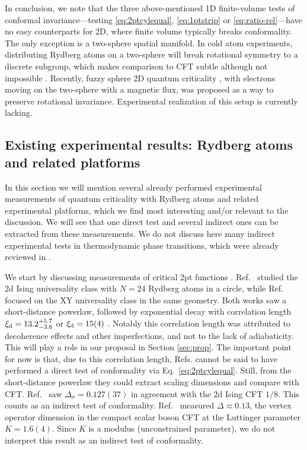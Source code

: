 \documentclass[a4paper,11pt]{article}
\theoremstyle{remark}
\theoremstyle{theorem}
\begin{document}
In conclusion, we note that the three above-mentioned 1D finite-volume tests
of conformal invariance---testing \eqref{eq:2ptcylequal}, \eqref{eq:1ptstrip}
or \eqref{eq:ratio-rel}---have no easy counterparts for 2D, where finite
volume typically breaks conformality. The only exception is a two-sphere
spatial manifold. In cold atom experiments, distributing Rydberg atoms on a
two-sphere will break rotational symmetry to a discrete subgroup, which makes
comparison to CFT subtle although not impossible
{\cite{Lao:2023zis,Wu:2026ayb}}. Recently, fuzzy sphere 2D quantum criticality
{\cite{Zhu:2022gjc}}, with electrons moving on the two-sphere with a magnetic
flux, was proposed as a way to preserve rotational invariance. Experimental
realization of this setup is currently lacking.

\subsection{Existing experimental results: Rydberg atoms and related
	platforms}

In this section we will mention several already performed experimental
measurements of quantum criticality with Rydberg atoms and related
experimental platforms, which we find most interesting and/or relevant to the discussion. We will see that one
direct test and several indirect ones can be extracted from these
measurements. We do not discuss here many indirect experimental tests in
thermodynamic phase transitions, which were already reviewed in
{\cite{Henkel1999,Rychkov:2025zks}}.

We start by discussing measurements of critical 2pt functions
{\cite{Fang:2024uyf,Emperauger:2025raf}}. Ref.~{\cite{Fang:2024uyf}} studied
the 2d Ising universality class with $N = 24$ Rydberg atoms in a circle, while
Ref.~{\cite{Emperauger:2025raf}} focused on the XY universality class in the
same geometry. Both works saw a short-distance powerlaw, followed by
exponential decay with correlation length $\xi_{\rm d} = 13.2^{+ 5.7}_{- 3.6}$
{\cite{Fang:2024uyf}} or $\xi_{\rm d} = 15 (4)$ {\cite{Emperauger:2025raf}}. Notably
this correlation length was attributed to decoherence effects and other
imperfections, and not to the lack of adiabaticity. This will play a role in
our proposal in Section \ref{sec:prop}. The important point for now is that, due to this correlation length,
Refs. {\cite{Fang:2024uyf,Emperauger:2025raf}} cannot be said to have
performed a direct test of conformality via Eq.~\eqref{eq:2ptcylequal}. Still,
from the short-distance powerlaw they could extract scaling dimensions and compare
with CFT. Ref.~{\cite{Fang:2024uyf}} saw $\Delta_{\sigma} = 0.127 (37)$ in
agreement with the 2d Ising CFT $1 / 8$. This counts as an indirect test of
conformality. Ref.~{\cite{Emperauger:2025raf}} measured $\Delta \approx 0.13$,
the vertex operator dimension in the compact scalar boson CFT at the Luttinger
parameter $K = 1.6 (4)$. Since $K$ is a modulus (unconstrained parameter), we
do not interpret this result as an indirect test of conformality.
\end{document}
